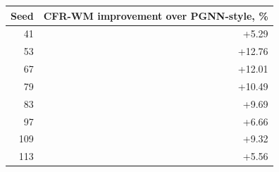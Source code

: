 \begin{tabular}{rr}
\toprule
Seed & CFR-WM improvement over PGNN-style, \% \\
\midrule
41 & +5.29 \\
53 & +12.76 \\
67 & +12.01 \\
79 & +10.49 \\
83 & +9.69 \\
97 & +6.66 \\
109 & +9.32 \\
113 & +5.56 \\
\bottomrule
\end{tabular}
